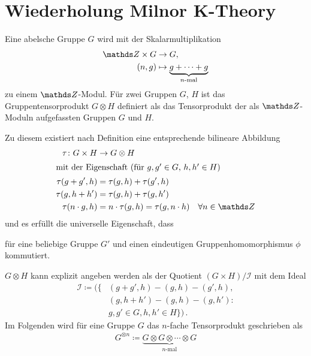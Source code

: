 \documentclass[ngerman,fontsize=11pt, paper=a4, parskip=half, titlepage=true, toc=bib]{scrartcl}
\begin{document}
\maketitle
\tableofcontents


\section{Wiederholung Milnor K-Theory}

\begin{Bem}[Gruppentensorprodukt]
  Eine abelsche Gruppe $G$ wird mit der Skalarmultiplikation
  \begin{align*}
    \Z \times G &\to G,\\
    (n,g)&\mapsto \underbrace{g+\dotsb+g}_{\scriptsize\text{$n$-mal}}
  \end{align*}
  zu einem $\Z$-Modul.
  Für zwei Gruppen $G$, $H$ ist das 
  Gruppentensorprodukt $G\otimes H$
  definiert als das Tensorprodukt der als $\Z$-Moduln
  aufgefassten Gruppen $G$ und $H$.

  Zu diesem existiert nach Definition eine 
  entsprechende bilineare Abbildung
  \begin{align*}
    \tau\colon G\times H&\rightarrow G\otimes H\\
    \intertext{mit der Eigenschaft (für $g,g'\in G$, $h,h'\in H$)}
    \tau(g+g',h) &= \tau(g,h)+\tau(g',h)\\
    \tau(g,h+h') &= \tau(g,h)+\tau(g,h')\\
    \tau(n\cdot g, h) &= n\cdot \tau(g,h)= \tau(g,n\cdot h)\quad
                        \forall n \in\Z
  \end{align*}
  und es erfüllt die universelle Eigenschaft, dass
  \begin{center}
  \end{center}
  für eine beliebige Gruppe $G'$ und einen eindeutigen Gruppenhomomorphismus $\phi$
  kommutiert.

  $G\otimes H$ kann explizit angeben werden als der Quotient
  $(G\times H) / \mathcal{I}$ mit dem Ideal 
  \begin{align*}
    \mathcal{I}\coloneqq \big(
    \big\{&(g+g',h)-(g,h)-(g',h), \\
          &(g,h+h')-(g,h)-(g,h') \colon\\
          &g,g'\in G, h,h'\in H \big\}
            \big)\,.
  \end{align*}
  Im Folgenden wird für eine Gruppe $G$ das $n$-fache Tensorprodukt
  geschrieben als
  \begin{gather*}
    G^{\otimes n}
    \coloneqq \underbrace{G\otimes G\otimes\dotsb\otimes G}_{n\text{-mal}}
  \end{gather*}
\end{Bem}
\end{document}
